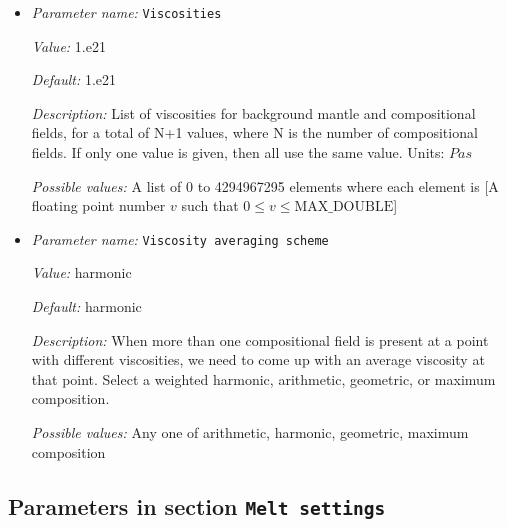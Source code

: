 \begin{itemize}
{\it Value:} false


{\it Default:} false


{\it Description:} Whether to apply a stress averaging scheme to account for differences between the fixed elastic time step and numerical time step. 


{\it Possible values:} A boolean value (true or false)
\item {\it Parameter name:} {\tt Viscosities}
\label{parameters:Material model/Viscoelastic/Viscosities}
\label{parameters:Material_20model/Viscoelastic/Viscosities}


{\it Value:} 1.e21


{\it Default:} 1.e21


{\it Description:} List of viscosities for background mantle and compositional fields, for a total of N+1 values, where N is the number of compositional fields. If only one value is given, then all use the same value. Units: $Pa s$


{\it Possible values:} A list of 0 to 4294967295 elements where each element is [A floating point number $v$ such that $0 \leq v \leq \text{MAX\_DOUBLE}$]
\item {\it Parameter name:} {\tt Viscosity averaging scheme}
\label{parameters:Material model/Viscoelastic/Viscosity averaging scheme}
\label{parameters:Material_20model/Viscoelastic/Viscosity_20averaging_20scheme}


{\it Value:} harmonic


{\it Default:} harmonic


{\it Description:} When more than one compositional field is present at a point with different viscosities, we need to come up with an average viscosity at that point.  Select a weighted harmonic, arithmetic, geometric, or maximum composition.


{\it Possible values:} Any one of arithmetic, harmonic, geometric, maximum composition 
\end{itemize}

\subsection{Parameters in section \tt Melt settings}
\label{parameters:Melt_20settings}

